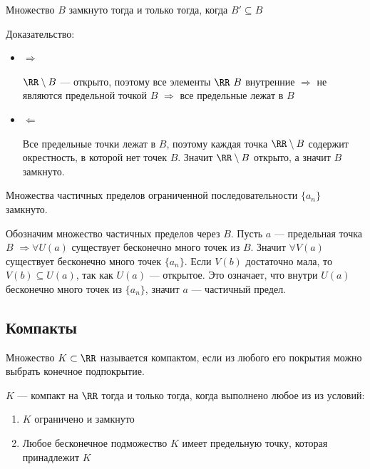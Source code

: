 \begin{thrm}{}{}
    Множество \( B \) замкнуто тогда и только тогда, когда \( B' \subseteq B \)
\end{thrm}

Доказательство:
\begin{itemize}
    \item
        \( \Rightarrow \)
        
        \( \RR \setminus B \) --- открыто, поэтому все элементы \( \RR \ B \) внутренние 
        \( \Rightarrow \) не являются предельной точкой \( B \)
        \( \Rightarrow \) все предельные лежат в \( B \)
    \item
        \( \Leftarrow \)

        Все предельные точки лежат в \( B \), 
        поэтому каждая точка \( \RR \setminus B \) содержит окрестность, в которой нет точек \( B \).
        Значит \( \RR \setminus B \) открыто, а значит \( B \) замкнуто.
\end{itemize}

\begin{thrm}{}{}
    Множества частичных пределов ограниченной последовательности \( \{ a_n \} \) замкнуто.
\end{thrm}

Обозначим множество частичных пределов через \( B \).
Пусть \( a \) --- предельная точка \( B \) 
\( \Rightarrow \forall U(a) \) существует бесконечно много точек из \( B \).
Значит \( \forall V(a) \) существует бесконечно много точек \( \{ a_n \} \).
Если \( V(b) \) достаточно мала, то \( V(b) \subseteq U(a) \), так как \( U(a) \) --- открытое.
Это означает, что внутри \( U(a) \) бесконечно много точек из \( \{ a_n \} \), значит \( a \) --- частичный предел.

\subsection{Компакты}

\begin{defn}{}{}
    Множество \( K \subset \RR \) называется компактом, если из любого его покрытия можно выбрать конечное подпокрытие.
\end{defn}

\begin{thrm}{}{}
    \( K \) --- компакт на \( \RR \) тогда и только тогда, когда выполнено любое из из условий:
    \begin{enumerate}
        \item
            \( K \) ограничено и замкнуто
        \item
            Любое бесконечное подможество \( K \) имеет предельную точку, которая принадлежит \( K \)
    \end{enumerate}
\end{thrm}
